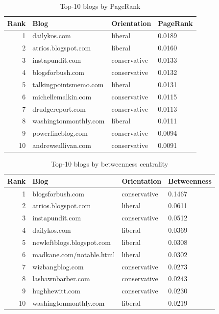 \documentclass[10pt,conference]{IEEEtran}
\begin{document}
\begin{table}[h]
\centering
\caption{Top-10 blogs by PageRank}
\label{tab:pr}
\small
\begin{tabular}{@{}rlll@{}}
\toprule
Rank & Blog & Orientation & PageRank \\
\midrule
1 & dailykos.com & liberal & 0.0189 \\
2 & atrios.blogspot.com & liberal & 0.0160 \\
3 & instapundit.com & conservative & 0.0133 \\
4 & blogsforbush.com & conservative & 0.0132 \\
5 & talkingpointsmemo.com & liberal & 0.0131 \\
6 & michellemalkin.com & conservative & 0.0115 \\
7 & drudgereport.com & conservative & 0.0113 \\
8 & washingtonmonthly.com & liberal & 0.0111 \\
9 & powerlineblog.com & conservative & 0.0094 \\
10 & andrewsullivan.com & conservative & 0.0091 \\
\bottomrule
\end{tabular}
\end{table}

\begin{table}[h]
\centering
\caption{Top-10 blogs by betweenness centrality}
\label{tab:bc}
\small
\begin{tabular}{@{}rlll@{}}
\toprule
Rank & Blog & Orientation & Betweenness \\
\midrule
1 & blogsforbush.com & conservative & 0.1467 \\
2 & atrios.blogspot.com & liberal & 0.0611 \\
3 & instapundit.com & conservative & 0.0512 \\
4 & dailykos.com & liberal & 0.0369 \\
5 & newleftblogs.blogspot.com & liberal & 0.0308 \\
6 & madkane.com/notable.html & liberal & 0.0302 \\
7 & wizbangblog.com & conservative & 0.0273 \\
8 & lashawnbarber.com & conservative & 0.0243 \\
9 & hughhewitt.com & conservative & 0.0230 \\
10 & washingtonmonthly.com & liberal & 0.0219 \\
\bottomrule
\end{tabular}
\end{table}
\end{document}
